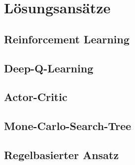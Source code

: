 \section{Lösungsansätze}\label{cap:loesungsansatze}

\subsection{Reinforcement Learning}
\subsection{Deep-Q-Learning}
\subsection{Actor-Critic}
\subsection{Mone-Carlo-Search-Tree}
\subsection{Regelbasierter Ansatz}
